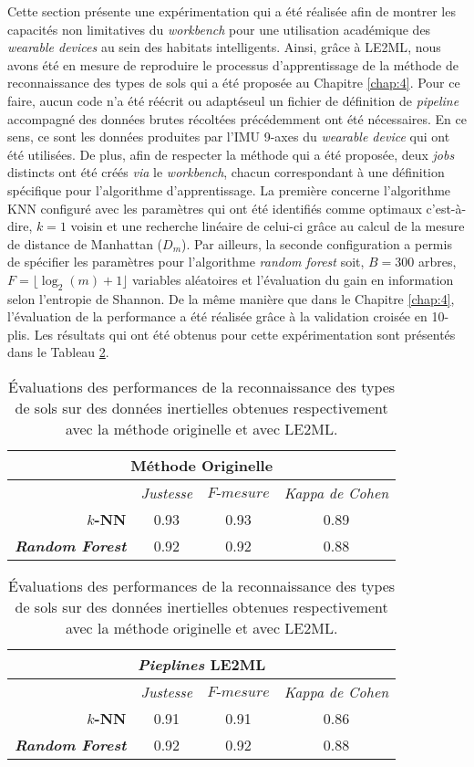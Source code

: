Cette section présente une expérimentation qui a été réalisée afin de montrer les capacités non limitatives du \textit{workbench} pour une utilisation académique des \textit{wearable devices} au sein des habitats intelligents. Ainsi, grâce à \acs{LE2ML}, nous avons été en mesure de reproduire le processus d'apprentissage de la méthode de reconnaissance des types de sols qui a été proposée au Chapitre \ref{chap:4}. Pour ce faire, aucun code n'a été réécrit ou adapté\textemdash seul un fichier de définition de \textit{pipeline} accompagné des données brutes récoltées précédemment ont été nécessaires. En ce sens, ce sont les données produites par l'\acs{IMU} 9-axes du \textit{wearable device} qui ont été utilisées. De plus, afin de respecter la méthode qui a été proposée, deux \textit{jobs} distincts ont été créés \textit{via} le \textit{workbench}, chacun correspondant à une définition spécifique pour l'algorithme d'apprentissage. La première concerne l'algorithme \acs{KNN} configuré avec les paramètres qui ont été identifiés comme optimaux c'est-à-dire, $k=1$ voisin et une recherche linéaire de celui-ci grâce au calcul de la mesure de distance de Manhattan ($D_m$). Par ailleurs, la seconde configuration a permis de spécifier les paramètres pour l'algorithme \textit{random forest} soit, $B=300$ arbres, $F=\lfloor\log_2(m) + 1\rfloor$ variables aléatoires et l’évaluation du gain en information selon l’entropie de Shannon. De la même manière que dans le Chapitre \ref{chap:4}, l'évaluation de la performance a été réalisée grâce à la validation croisée en 10-plis. Les résultats qui ont été obtenus pour cette expérimentation sont présentés dans le Tableau \ref{tab:results_workbench}.

\begin{table}[H]
  \centering
  \caption{Évaluations des performances de la reconnaissance des types de sols sur des données inertielles obtenues respectivement avec la méthode originelle et avec \acs{LE2ML}.}
  \label{tab:results_workbench}
  \begin{tabular}{@{}rccc@{}}
    \toprule
      \multicolumn{4}{c}{\textbf{Méthode Originelle}} \\
    \midrule
      \multicolumn{1}{l}{} & \textit{Justesse} & $F\mbox{-} mesure$ & \textit{Kappa de Cohen} \\[-10pt]
      \textbf{$k$-NN} & 0.93 & 0.93 & 0.89 \\[-10pt]
      \textbf{\textit{Random Forest}} & 0.92 & 0.92 & 0.88 \\
    \bottomrule
  \end{tabular}
  \begin{tabular}{@{}rccc@{}}
      \multicolumn{4}{c}{\textbf{\textit{Pieplines} \acs{LE2ML}}} \\
    \midrule
      \multicolumn{1}{l}{} & \textit{Justesse} & $F\mbox{-} mesure$ & \textit{Kappa de Cohen} \\[-10pt]
      \textbf{$k$-NN} & 0.91 & 0.91 & 0.86 \\[-10pt]
      \textbf{\textit{Random Forest}} & 0.92 & 0.92 & 0.88 \\
    \bottomrule
  \end{tabular}
\end{table}

